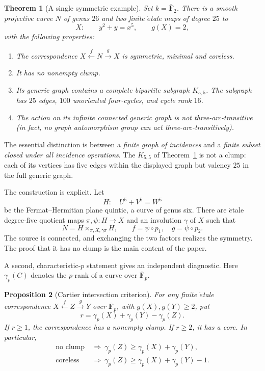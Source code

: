 \documentclass[11pt,a4paper,reqno]{amsart}
\newtheorem{theorem}{Theorem}[section]
\newtheorem{proposition}[theorem]{Proposition}
\newcommand{\FF}{\mathbf F}
\begin{document}
\begin{theorem}[A single symmetric example]\label{thm:main}
Set $k=\overline{\FF}_2$. There is a smooth projective curve $N$ of
genus $26$ and two finite \(\acute{e}\)tale maps of degree $25$ to
\[
     X:\qquad y^2+y=x^5,\qquad g(X)=2,
\]
with the following properties:
\begin{enumerate}
\item The correspondence $X\xleftarrow{f}N\xrightarrow{g}X$ is symmetric,
minimal and coreless.
\item It has no nonempty clump.
\item Its generic graph contains a complete bipartite subgraph $K_{5,5}$.
The subgraph has $25$ edges, $100$ unoriented four-cycles, and cycle rank
$16$.
\item The action on its infinite connected generic graph is not
three-arc-transitive (in fact, no graph automorphism group can act
three-arc-transitively).
\end{enumerate}
\end{theorem}

The essential distinction is between a \emph{finite graph of incidences}
and a \emph{finite subset closed under all incidence operations}.  The
$K_{5,5}$ of Theorem~\ref{thm:main} is not a clump: each of its vertices
has five edges within the displayed graph but valency $25$ in the full
generic graph.

The construction is explicit. Let
\begin{equation}\label{eq:hermitian}
 H:\quad U^5+V^5=W^5
\end{equation}
be the Fermat--Hermitian plane quintic, a curve of genus six.  There are
\(\acute{e}\)tale degree-five quotient maps $\pi,\psi:H\to X$ and an
involution $\gamma$ of $X$ such that
\begin{equation}\label{eq:fiberprod}
 N=H\times_{\pi,X,\gamma\pi}H,
 \qquad f=\psi\circ p_1,\quad g=\psi\circ p_2.
\end{equation}
The source is connected, and exchanging the two factors realizes the
symmetry.  The proof that it has no clump is the main content of the paper.

A second, characteristic-$p$ statement gives an independent diagnostic.
Here $\gamma_p(C)$ denotes the $p$-rank of a curve over
$\overline{\FF}_p$.

\begin{proposition}[Cartier intersection criterion]\label{prop:rank}
For any finite \(\acute{e}\)tale correspondence
$X\xleftarrow{f}Z\xrightarrow{g}Y$ over $\overline{\FF}_p$, with
$g(X),g(Y)\ge 2$, put
\[
 r=\gamma_p(X)+\gamma_p(Y)-\gamma_p(Z).
\]
If $r\ge 1$, the correspondence has a nonempty clump. If $r\ge2$,
it has a core. In particular,
\begin{align}
 \text{no clump}&\ \Longrightarrow\ 
 \gamma_p(Z)\ge\gamma_p(X)+\gamma_p(Y),\label{eq:rank-ineq}\\
 \text{coreless}&\ \Longrightarrow\ 
 \gamma_p(Z)\ge\gamma_p(X)+\gamma_p(Y)-1.\label{eq:core-ineq}
\end{align}
\end{proposition}
\end{document}
